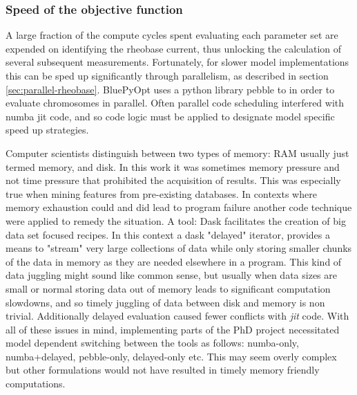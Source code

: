 \subsubsection{Speed of the objective function}
A large fraction of the compute cycles spent evaluating each parameter set are expended on identifying the rheobase current, thus unlocking the calculation of several subsequent measurements.
Fortunately, for slower model implementations this can be sped up significantly through parallelism, as described in section \ref{sec:parallel-rheobase}. BluePyOpt uses a python library pebble to in order to evaluate chromosomes in parallel. Often parallel code scheduling interfered with numba jit code, and so code logic must be applied to designate model specific speed up strategies. 

Computer scientists distinguish between two types of memory: RAM usually just termed memory, and disk. In this work it was sometimes memory pressure and not time pressure that prohibited the acquisition of results. This was especially true when mining features from pre-existing databases. In contexts where memory exhaustion could and did lead to program failure another code technique were applied to remedy the situation. A tool: Dask \cite{rocklin2015dask} facilitates the creation of big data set focused recipes. In this context a dask "delayed" iterator, provides a means to "stream" very large collections of data while only storing smaller chunks of the data in memory as they are needed elsewhere in a program. This kind of data juggling might sound like common sense, but usually when data sizes are small or normal storing data out of memory leads to significant computation slowdowns, and so timely juggling of data between disk and memory is non trivial. %
Additionally delayed evaluation caused fewer conflicts with \emph{jit} code. With all of these issues in mind, implementing parts of the PhD project necessitated model dependent switching between the tools as follows: numba-only, numba+delayed, pebble-only, delayed-only etc. This may seem overly complex but other formulations would not have resulted in timely memory friendly computations.



